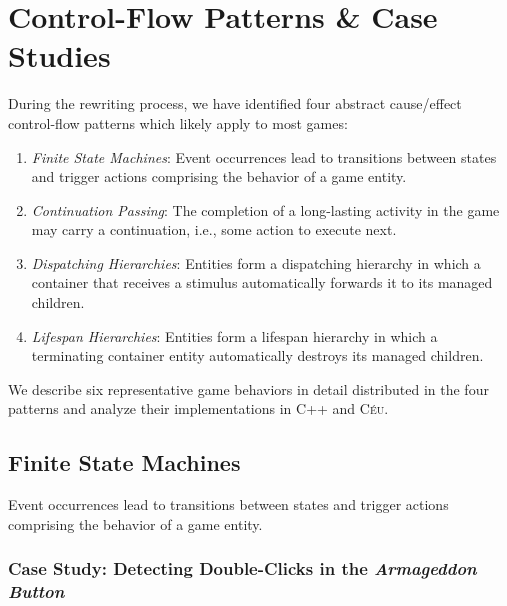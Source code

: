 \documentclass[10pt, conference, compsocconf]{IEEEtran}
\newcommand{\CEU}{\textsc{C\'{e}u}\xspace}
\begin{document}
\section{Control-Flow Patterns \& Case Studies}
\label{sec.pats}

During the rewriting process, we have identified four abstract cause/effect
control-flow patterns which likely apply to most games:

\begin{enumerate}
\item \emph{Finite State Machines}:
    Event occurrences lead to transitions between states and trigger actions
    comprising the behavior of a game entity.
\item \emph{Continuation Passing}:
    The completion of a long-lasting activity in the game may carry a
    continuation, i.e., some action to execute next.
\item \emph{Dispatching Hierarchies}:
    Entities form a dispatching hierarchy in which a container that receives a
    stimulus automatically forwards it to its managed children.
\item \emph{Lifespan Hierarchies}:
    Entities form a lifespan hierarchy in which a terminating container entity
    automatically destroys its managed children.
\end{enumerate}

We describe six representative game behaviors in detail distributed in the four
patterns and analyze their implementations in C++ and \CEU.%

\subsection{Finite State Machines}
\label{sec.pats.fsms}

    Event occurrences lead to transitions between states and trigger actions
    comprising the behavior of a game entity.

\subsubsection{Case Study: Detecting Double-Clicks in the \emph{Armageddon Button}}
\end{document}
